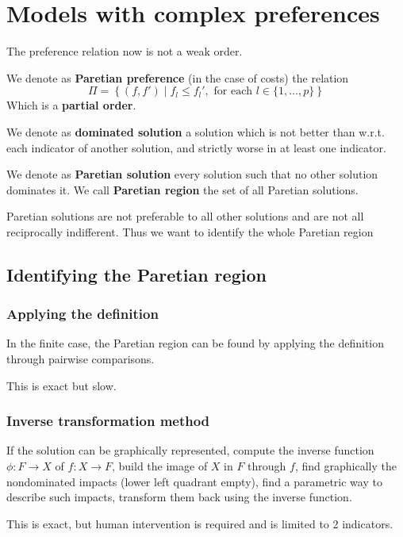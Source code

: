 \section{Models with complex preferences}

The preference relation now is not a weak order. 

We denote as \textbf{Paretian preference} (in the case of costs) the relation 
$$ \Pi = \left\{(f, f') \mid f_l \leq f_l', \text{ for each } l \in \{1, \dots, p\}\right\} $$
Which is a \textbf{partial order}.

We denote as \textbf{dominated solution} a solution which is not better than w.r.t. each indicator of another solution, and strictly worse in at least one indicator.

We denote as \textbf{Paretian solution} every solution such that no other solution dominates it. We call \textbf{Paretian region} the set of all Paretian solutions.

Paretian solutions are not preferable to all other solutions and are not all reciprocally indifferent. Thus we want to identify the whole Paretian region

\subsection{Identifying the Paretian region}

\subsubsection{Applying the definition}

In the finite case, the Paretian region can be found by applying the definition through pairwise comparisons. 

This is exact but slow.

\subsubsection{Inverse transformation method}

If the solution can be graphically represented, compute the inverse function $\phi: F \rightarrow X$ of $f: X \rightarrow F$, build the image of $X$ in $F$ through $f$, find graphically the nondominated impacts (lower left quadrant empty), find a parametric way to describe such impacts, transform them back using the inverse function. 

This is exact, but human intervention is required and is limited to 2 indicators.

